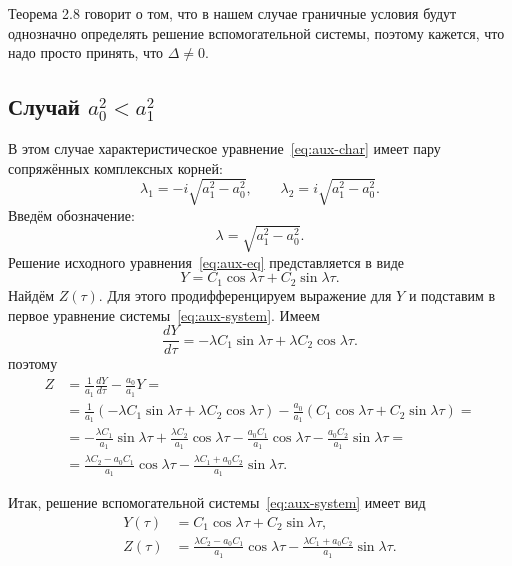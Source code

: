 \documentclass[a4paper,14pt]{article}
\begin{document}
Теорема 2.8 говорит о том, что в нашем случае
граничные условия будут однозначно определять решение
вспомогательной системы, поэтому кажется, что надо
просто принять, что $\Delta \neq 0$.

\subsection{Случай $a_0^2 < a_1^2$}

В этом случае характеристическое уравнение~\eqref{eq:aux-char}
имеет пару сопряжённых комплексных корней:
\begin{equation*}
  \lambda_1 = -i \sqrt{a_1^2 - a_0^2},
  \qquad
  \lambda_2 = i \sqrt{a_1^2 - a_0^2}.
\end{equation*}
Введём обозначение:
\begin{equation*}
  \lambda = \sqrt{a_1^2 - a_0^2}.
\end{equation*}
Решение исходного уравнения~\eqref{eq:aux-eq} представляется в
виде
\begin{equation*}
  Y = C_1 \cos \lambda \tau + C_2 \sin \lambda \tau.
\end{equation*}
Найдём $Z(\tau)$. Для этого продифференцируем выражение для $Y$
и подставим в первое уравнение системы~\eqref{eq:aux-system}.
Имеем
\begin{equation*}
  \frac{d Y}{d \tau}
  = - \lambda C_1 \sin \lambda \tau
  + \lambda C_2 \cos \lambda \tau.
\end{equation*}
поэтому
\begin{equation*}
  \begin{aligned}
    Z
    &=
      \frac{1}{a_1} \frac{d Y}{d \tau} - \frac{a_0}{a_1} Y = \\
    &=
      \frac{1}{a_1} \left(
      - \lambda C_1 \sin \lambda \tau
      + \lambda C_2 \cos \lambda \tau
      \right)
      - \frac{a_0}{a_1} \left(
      C_1 \cos \lambda \tau + C_2 \sin \lambda \tau
      \right) = \\
    &=
      - \frac{\lambda C_1}{a_1} \sin \lambda \tau
      + \frac{\lambda C_2}{a_1} \cos \lambda \tau
      - \frac{a_0 C_1}{a_1} \cos \lambda \tau
      - \frac{a_0 C_2}{a_1} \sin \lambda \tau = \\
    &=
      \frac{\lambda C_2 - a_0 C_1}{a_1}
      \cos \lambda \tau
      -
      \frac{\lambda C_1 + a_0 C_2}{a_1}
      \sin \lambda \tau.
  \end{aligned}
\end{equation*}

Итак, решение вспомогательной системы~\eqref{eq:aux-system}
имеет вид
\begin{equation}
  \label{eq:aux-system-gen-solution}
  \begin{aligned}
    Y(\tau)
    &=
      C_1 \cos \lambda \tau + C_2 \sin \lambda \tau, \\
    Z(\tau)
    &=
      \frac{\lambda C_2 - a_0 C_1}{a_1}
      \cos \lambda \tau
      -
      \frac{\lambda C_1 + a_0 C_2}{a_1}
      \sin \lambda \tau.
  \end{aligned}
\end{equation}
\end{document}
